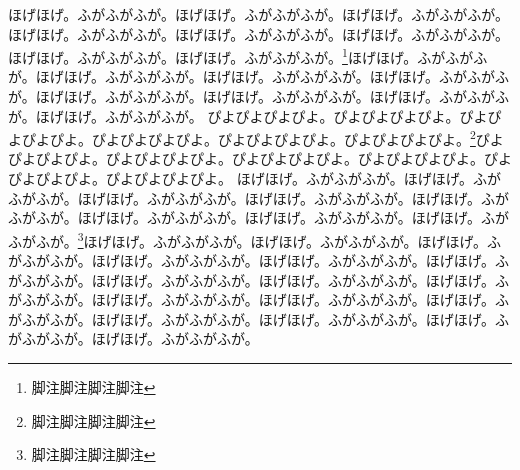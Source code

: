 \documentclass[a4paper]{tarticle}
\def\hoge{ほげほげ。ふがふがふが。}%
\def\piyo{ぴよぴよぴよぴよ。}
\def\HOGE{\hoge\hoge\hoge\hoge\hoge\hoge\hoge\hoge}
\def\PIYO{\piyo\piyo\piyo\piyo\piyo\piyo}
\begin{document}
\begin{multicols}{2}
\HOGE\footnote{脚注脚注脚注脚注}\HOGE
\columnbreak
\PIYO\footnote{脚注脚注脚注脚注}\PIYO
\newpage
\HOGE\footnote{脚注脚注脚注脚注}\HOGE\HOGE
\end{multicols}
\end{document}
